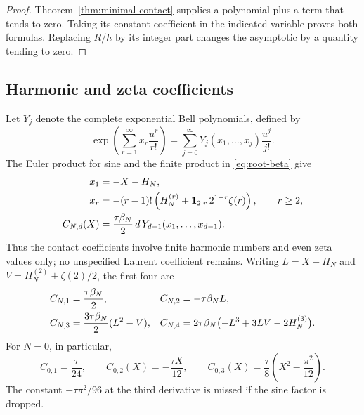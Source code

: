 \documentclass[11pt,letterpaper]{article}
\numberwithin{equation}{section}
\theoremstyle{definition}
\theoremstyle{remark}
\begin{document}
\begin{proof}
Theorem~\ref{thm:minimal-contact} supplies a polynomial plus a term
that tends to zero. Taking its constant coefficient in the indicated
variable proves both formulas. Replacing \(R/h\) by its integer part
changes the asymptotic by a quantity tending to zero.
\end{proof}

\subsection{Harmonic and zeta coefficients}

Let \(Y_j\) denote the complete exponential Bell polynomials,
defined by
\[
 \exp\left(\sum_{r=1}^{\infty}x_r\frac{u^r}{r!}\right)
   =\sum_{j=0}^{\infty}Y_j(x_1,\ldots,x_j)\frac{u^j}{j!}.
\]
The Euler product for sine and the finite product in
\eqref{eq:root-beta} give
\begin{align}
 x_1&=-X-H_N,\notag\\
 x_r&=-(r-1)!\left(H_N^{(r)}
                +\mathbf1_{2\mid r}\,2^{1-r}\zeta(r)\right),
                  \qquad r\geq2,\label{eq:contact-bell}\\
 C_{N,d}(X)&=\frac{\tau\beta_N}{2}\,d\,
       Y_{d-1}(x_1,\ldots,x_{d-1}).\label{eq:contact-bell-value}
\end{align}
Thus the contact coefficients involve finite harmonic numbers and
even zeta values only; no unspecified Laurent coefficient remains.
Writing \(L=X+H_N\) and
\(V=H_N^{(2)}+\zeta(2)/2\), the first four are
\begin{align}
 C_{N,1}&=\frac{\tau\beta_N}{2},&
 C_{N,2}&=-\tau\beta_N L,\notag\\
 C_{N,3}&=\frac{3\tau\beta_N}{2}(L^2-V),&
 C_{N,4}&=2\tau\beta_N
       \bigl(-L^3+3LV-2H_N^{(3)}\bigr).
 \label{eq:first-four-contacts}
\end{align}
For \(N=0\), in particular,
\begin{equation}\label{eq:gamma-cubic-contact}
 C_{0,1}=\frac{\tau}{24},\qquad
 C_{0,2}(X)=-\frac{\tau X}{12},\qquad
 C_{0,3}(X)=\frac{\tau}{8}
                    \left(X^2-\frac{\pi^2}{12}\right).
\end{equation}
The constant \(-\tau\pi^2/96\) at the third derivative is missed
if the sine factor is dropped.
\end{document}
